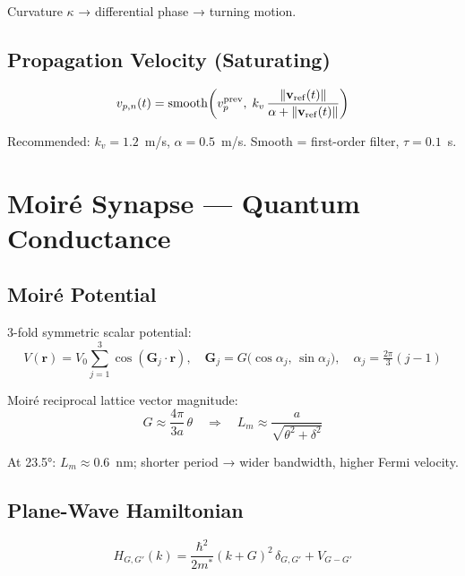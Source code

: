 \documentclass[12pt, a4paper]{article}
\begin{document}
Curvature $\kappa$ → differential phase → turning motion.

\subsection{Propagation Velocity (Saturating)}

\begin{equation}\label{eq:vp_map}
  v_{p,n}(t)
  = \operatorname{smooth}\!\left(v_p^{\rm prev},\;
    k_v\,\frac{\|\mathbf{v}_{\rm ref}(t)\|}{\alpha + \|\mathbf{v}_{\rm ref}(t)\|}
    \right)
\end{equation}

Recommended: $k_v = 1.2$~m/s, $\alpha = 0.5$~m/s. Smooth = first-order filter, $\tau = 0.1$~s.

\section{Moiré Synapse — Quantum Conductance}

\subsection{Moiré Potential}

3-fold symmetric scalar potential:
\begin{equation}\label{eq:moire_pot}
  V(\mathbf{r}) = V_0 \sum_{j=1}^{3} \cos(\mathbf{G}_j \cdot \mathbf{r}),
  \quad
  \mathbf{G}_j = G\bigl(\cos\alpha_j,\,\sin\alpha_j\bigr),
  \quad \alpha_j = \tfrac{2\pi}{3}(j-1)
\end{equation}

Moiré reciprocal lattice vector magnitude:
\begin{equation}\label{eq:moire_G}
  G \approx \frac{4\pi}{3a}\,\theta
  \quad \Rightarrow \quad
  L_m \approx \frac{a}{\sqrt{\theta^2 + \delta^2}}
\end{equation}

At 23.5°: $L_m \approx 0.6$~nm; shorter period → wider bandwidth, higher Fermi velocity.

\subsection{Plane-Wave Hamiltonian}

\begin{equation}\label{eq:pw_hamiltonian}
  H_{G,G'}(k) = \frac{\hbar^2}{2m^*}(k+G)^2\,\delta_{G,G'} + V_{G-G'}
\end{equation}
\end{document}
